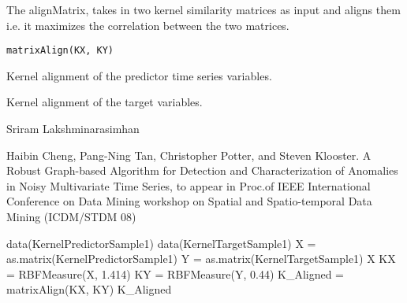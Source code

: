 \begin{Description}\relax
The alignMatrix, takes in two kernel similarity matrices as input and aligns them i.e. it maximizes the correlation between the two matrices.
\end{Description}
\begin{Usage}
\begin{verbatim}
matrixAlign(KX, KY)
\end{verbatim}
\end{Usage}
\begin{Arguments}
\begin{ldescription}
\item[\code{X}] Kernel alignment of the predictor time series variables.

\item[\code{Y}] Kernel alignment of the target variables.

\end{ldescription}
\end{Arguments}
\begin{Author}\relax
Sriram Lakshminarasimhan
\end{Author}
\begin{References}\relax
[1] Haibin Cheng, Pang-Ning Tan, Christopher Potter, and Steven Klooster. 
A Robust Graph-based Algorithm for Detection and Characterization of Anomalies in Noisy
Multivariate Time Series, to appear in Proc.of IEEE International Conference on Data Mining
workshop on Spatial and Spatio-temporal Data Mining (ICDM/STDM 08)
\end{References}
\begin{Examples}
\begin{ExampleCode}
data(KernelPredictorSample1)
data(KernelTargetSample1)
X = as.matrix(KernelPredictorSample1)
Y = as.matrix(KernelTargetSample1)
X
KX = RBFMeasure(X, 1.414)
KY = RBFMeasure(Y, 0.44)
K_Aligned = matrixAlign(KX, KY)
K_Aligned
\end{ExampleCode}
\end{Examples}

